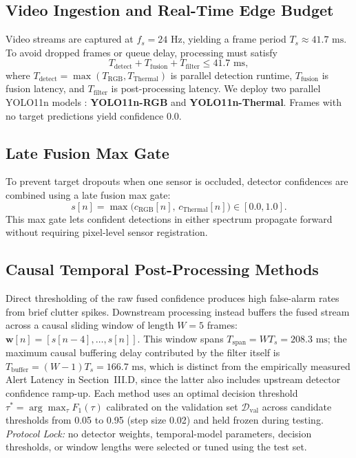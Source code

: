 \documentclass[conference]{IEEEtran}
\begin{document}
\subsection{Video Ingestion and Real-Time Edge Budget}
Video streams are captured at $f_s = 24\text{ Hz}$, yielding a frame period $T_s \approx 41.7\text{ ms}$. To avoid dropped frames or queue delay, processing must satisfy
\begin{equation}
T_{\text{detect}} + T_{\text{fusion}} + T_{\text{filter}} \le 41.7\text{ ms},
\label{eq:realtime_budget}
\end{equation}
where $T_{\text{detect}} = \max(T_{\text{RGB}}, T_{\text{Thermal}})$ is parallel detection runtime, $T_{\text{fusion}}$ is fusion latency, and $T_{\text{filter}}$ is post-processing latency. We deploy two parallel YOLO11n models \cite{jocher2024yolo11}: \textbf{YOLO11n-RGB} and \textbf{YOLO11n-Thermal}. Frames with no target predictions yield confidence 0.0.

\subsection{Late Fusion Max Gate}
To prevent target dropouts when one sensor is occluded, detector confidences are combined using a late fusion max gate:
\begin{equation}
s[n] = \max\big(c_{\text{RGB}}[n], \, c_{\text{Thermal}}[n]\big) \in [0.0, 1.0].
\label{eq:late_fusion}
\end{equation}
This max gate lets confident detections in either spectrum propagate forward without requiring pixel-level sensor registration.

\subsection{Causal Temporal Post-Processing Methods}
Direct thresholding of the raw fused confidence produces high false-alarm rates from brief clutter spikes. Downstream processing instead buffers the fused stream across a causal sliding window of length $W = 5$ frames: $\mathbf{w}[n] = [s[n-4], \dots, s[n]]$. This window spans $T_{\text{span}} = WT_s = 208.3\text{ ms}$; the maximum causal buffering delay contributed by the filter itself is $T_{\text{buffer}} = (W-1)T_s = 166.7\text{ ms}$, which is distinct from the empirically measured Alert Latency in Section~III.D, since the latter also includes upstream detector confidence ramp-up. Each method uses an optimal decision threshold $\tau^* = \arg\max_\tau F_1(\tau)$ calibrated on the validation set $\mathcal{D}_{\text{val}}$ across candidate thresholds from 0.05 to 0.95 (step size 0.02) and held frozen during testing. \textit{Protocol Lock:} no detector weights, temporal-model parameters, decision thresholds, or window lengths were selected or tuned using the test set.
\end{document}
